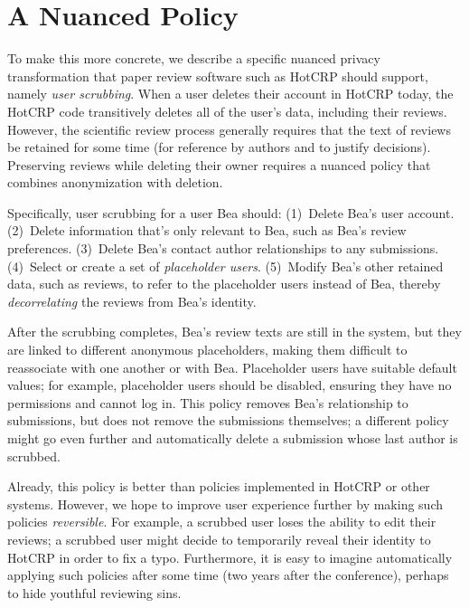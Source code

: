 \section{A Nuanced Policy}
\label{design:eg}


To make this more concrete, we describe a specific nuanced privacy transformation that paper review
software such as HotCRP should support, namely \emph{user scrubbing}.
%
When a user deletes their account in HotCRP today, the HotCRP code transitively deletes all of the
user's data, including their reviews.
%
However, the scientific review process generally requires that the text of
reviews be retained for some time (for reference by authors and to justify
decisions).
%
Preserving reviews while deleting their owner requires a nuanced policy
that combines anonymization with deletion.


Specifically, user scrubbing for a user Bea should:
%
(1)~Delete Bea's user account.
%
(2)~Delete information that's only relevant to Bea, such as Bea's review
preferences.
%
(3)~Delete Bea's contact author relationships to any submissions.
%
(4)~Select or create a set of \emph{placeholder users}.
%
(5)~Modify Bea's other retained data, such as reviews, to refer to the
placeholder users instead of Bea, thereby \emph{decorrelating} the reviews from Bea's identity.


After the scrubbing completes, Bea's review texts are still in the system, but
they are linked to different anonymous placeholders, making them difficult to
reassociate with one another or with Bea.
%
Placeholder users have suitable default values; for example, placeholder
users should be disabled,
ensuring they have no permissions and cannot log in.
%
This policy removes Bea's relationship to submissions, but does not remove the
submissions themselves; a different policy might go even further and
automatically delete a submission whose last author is scrubbed.
%

Already, this policy is better than policies implemented in HotCRP or other systems.
%
However, we hope to improve user experience further by making such policies
\emph{reversible}.
%
For example, a scrubbed user loses the ability to edit their reviews; a
scrubbed user might decide to temporarily reveal their identity to HotCRP in
order to fix a typo.
%
Furthermore, it is easy to imagine automatically applying such policies
after some time (\eg two years after the conference), perhaps to hide youthful
reviewing sins.
%

